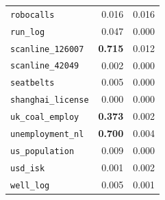 \begin{tabular}{lrr}
\verb+robocalls+ & 0.016 & 0.016\\
\verb+run_log+ & 0.047 & 0.000\\
\verb+scanline_126007+ & \textbf{0.715} & 0.012\\
\verb+scanline_42049+ & 0.002 & 0.000\\
\verb+seatbelts+ & 0.005 & 0.000\\
\verb+shanghai_license+ & 0.000 & 0.000\\
\verb+uk_coal_employ+ & \textbf{0.373} & 0.002\\
\verb+unemployment_nl+ & \textbf{0.700} & 0.004\\
\verb+us_population+ & 0.009 & 0.000\\
\verb+usd_isk+ & 0.001 & 0.002\\
\verb+well_log+ & 0.005 & 0.001\\
\bottomrule
\end{tabular}
